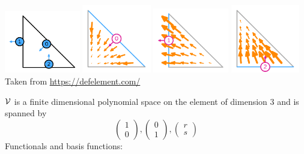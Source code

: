\begin{center}
\includegraphics[width=3.3cm]{images/pair_raviart-thomas/element-Raviart-Thomas-variant-equispaced-triangle-1-dofs-large}
\includegraphics[width=3cm]{images/pair_raviart-thomas/element-Raviart-Thomas-variant-equispaced-triangle-1-0-large}
\includegraphics[width=3.3cm]{images/pair_raviart-thomas/element-Raviart-Thomas-variant-equispaced-triangle-1-1-large}
\includegraphics[width=3cm]{images/pair_raviart-thomas/element-Raviart-Thomas-variant-equispaced-triangle-1-2-large}\\
{\captionfont Taken from \url{https://defelement.com/}}
\end{center}

${\cal V}$ is a finite dimensional polynomial space on the element of dimension $3$ and is spanned by \cite{ergu21_72} 
\[
\left( \begin{array}{c} 1 \\ 0  \end{array} \right),
\left( \begin{array}{c} 0 \\ 1  \end{array} \right),
\left( \begin{array}{c} r \\ s  \end{array} \right)
\]
Functionals and basis functions:

